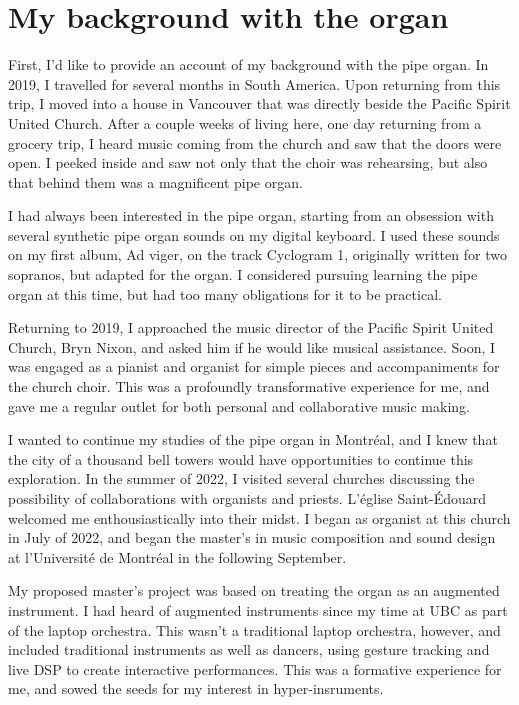 \documentclass[12pt,twoside,maitrise]{dms_ks}
\theoremstyle{definition}
\begin{document}
\section{My background with the organ}

First, I’d like to provide an account of my background with the pipe organ.
In 2019, I travelled for several months in South America.
Upon returning from this trip, I moved into a house in Vancouver that was directly beside the Pacific Spirit United Church.
After a couple weeks of living here, one day returning from a grocery trip, I heard music coming from the church and saw that the doors were open.
I peeked inside and saw not only that the choir was rehearsing, but also that behind them was a magnificent pipe organ.

I had always been interested in the pipe organ, starting from an obsession with several synthetic pipe organ sounds on my digital keyboard.
I used these sounds on my first album, Ad viger, on the track Cyclogram 1, originally written for two sopranos, but adapted for the organ.
I considered pursuing learning the pipe organ at this time, but had too many obligations for it to be practical.

Returning to 2019, I approached the music director of the Pacific Spirit United Church, Bryn Nixon, and asked him if he would like musical assistance.
Soon, I was engaged as a pianist and organist for simple pieces and accompaniments for the church choir.
This was a profoundly transformative experience for me, and gave me a regular outlet for both personal and collaborative music making.

I wanted to continue my studies of the pipe organ in Montréal, and I knew that the city of a thousand bell towers would have opportunities to continue this exploration.
In the summer of 2022, I visited several churches discussing the possibility of collaborations with organists and priests. L’église Saint-Édouard welcomed me enthousiastically into their midst.
I began as organist at this church in July of 2022, and began the master’s in music composition and sound design at l’Université de Montréal in the following September.

My proposed master’s project was based on treating the organ as an augmented instrument.
I had heard of augmented instruments since my time at UBC as part of the laptop orchestra.
This wasn’t a traditional laptop orchestra, however, and included traditional instruments as well as dancers, using gesture tracking and live DSP to create interactive performances.
This was a formative experience for me, and sowed the seeds for my interest in hyper-insruments.
\end{document}
